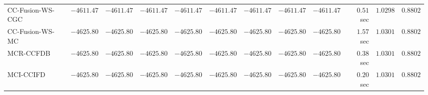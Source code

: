 \begin{table}[H]
\begin{tabular}{lrrrrrrrrrrr}
    CC-Fusion-WS-CGC & $     -4611.47$ & $     -4611.47$ & $     -4611.47$ & $     -4611.47$ & $     -4611.47$ & $     -4611.47$ & $     -4611.47$ & $     -4611.47$ & $         0.51$ sec    & $       1.0298$  & $       0.8802$ \\ 
     CC-Fusion-WS-MC & $     -4625.80$ & $     -4625.80$ & $     -4625.80$ & $     -4625.80$ & $     -4625.80$ & $     -4625.80$ & $     -4625.80$ & $     -4625.80$ & $         1.57$ sec    & $       1.0301$  & $       0.8802$ \\ 
\cmidrule{1-1} 
           MCR-CCFDB & $     -4625.80$ & $     -4625.80$ & $     -4625.80$ & $     -4625.80$ & $     -4625.80$ & $     -4625.80$ & $     -4625.80$ & $     -4625.80$ & $         0.38$ sec    & $       1.0301$  & $       0.8802$ \\ 
\cmidrule{1-1} 
           MCI-CCIFD & $     -4625.80$ & $     -4625.80$ & $     -4625.80$ & $     -4625.80$ & $     -4625.80$ & $     -4625.80$ & $     -4625.80$ & $     -4625.80$ & $         0.20$ sec    & $       1.0301$  & $       0.8802$ \\ 
\bottomrule
\end{tabular}
\end{table}

